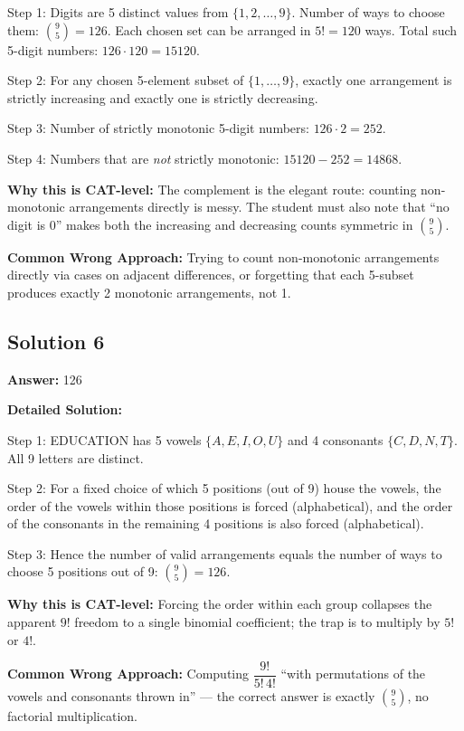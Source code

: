 \documentclass[11pt,a4paper]{article}
\begin{document}
Step 1: Digits are 5 distinct values from \(\{1, 2, \ldots, 9\}\). Number of ways to choose them: \(\binom{9}{5} = 126\). Each chosen set can be arranged in \(5! = 120\) ways. Total such 5-digit numbers: \(126 \cdot 120 = 15120\).

Step 2: For any chosen 5-element subset of \(\{1, \ldots, 9\}\), exactly one arrangement is strictly increasing and exactly one is strictly decreasing.

Step 3: Number of strictly monotonic 5-digit numbers: \(126 \cdot 2 = 252\).

Step 4: Numbers that are \emph{not} strictly monotonic: \(15120 - 252 = 14868\).

\textbf{Why this is CAT-level:} The complement is the elegant route: counting non-monotonic arrangements directly is messy. The student must also note that ``no digit is 0'' makes both the increasing and decreasing counts symmetric in \(\binom{9}{5}\).

\textbf{Common Wrong Approach:} Trying to count non-monotonic arrangements directly via cases on adjacent differences, or forgetting that each 5-subset produces exactly 2 monotonic arrangements, not 1.

\subsection*{Solution 6}
\textbf{Answer:} 126

\textbf{Detailed Solution:}

Step 1: EDUCATION has 5 vowels \(\{A, E, I, O, U\}\) and 4 consonants \(\{C, D, N, T\}\). All 9 letters are distinct.

Step 2: For a fixed choice of which 5 positions (out of 9) house the vowels, the order of the vowels within those positions is forced (alphabetical), and the order of the consonants in the remaining 4 positions is also forced (alphabetical).

Step 3: Hence the number of valid arrangements equals the number of ways to choose 5 positions out of 9: \(\binom{9}{5} = 126\).

\textbf{Why this is CAT-level:} Forcing the order within each group collapses the apparent \(9!\) freedom to a single binomial coefficient; the trap is to multiply by \(5!\) or \(4!\).

\textbf{Common Wrong Approach:} Computing \(\dfrac{9!}{5! \, 4!}\) ``with permutations of the vowels and consonants thrown in'' --- the correct answer is exactly \(\binom{9}{5}\), no factorial multiplication.
\end{document}

